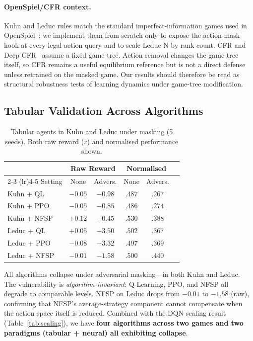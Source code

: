 \documentclass{article}
\begin{document}
\paragraph{OpenSpiel/CFR context.}
Kuhn and Leduc rules match the standard imperfect-information games used in OpenSpiel~\citep{lanctot2019openspiel}; we implement them from scratch only to expose the action-mask hook at every legal-action query and to scale Leduc-N by rank count. CFR and Deep CFR~\citep{zinkevich2007regret,brown2019deep} assume a fixed game tree. Action removal changes the game tree itself, so CFR remains a useful equilibrium reference but is not a direct defense unless retrained on the masked game. Our results should therefore be read as structural robustness tests of learning dynamics under game-tree modification.

\subsection{Tabular Validation Across Algorithms}
\label{sec:tabular}

\begin{table}[ht]
\centering
\caption{Tabular agents in Kuhn and Leduc under masking (5 seeds). Both raw reward ($r$) and normalised performance shown.}
\label{tab:tabular}
\begin{tabular}{lccccc}
\toprule
& \multicolumn{2}{c}{Raw Reward} & \multicolumn{2}{c}{Normalised} \\
\cmidrule(lr){2-3} \cmidrule(lr){4-5}
Setting & None & Advers. & None & Advers. \\
\midrule
Kuhn + QL & $-0.05$ & $-0.98$ & $.487$ & $.267$ \\
Kuhn + PPO & $-0.05$ & $-0.85$ & $.486$ & $.274$ \\
Kuhn + NFSP & $+0.12$ & $-0.45$ & $.530$ & $.388$ \\
Leduc + QL & $+0.05$ & $-3.50$ & $.502$ & $.367$ \\
Leduc + PPO & $-0.08$ & $-3.32$ & $.497$ & $.369$ \\
Leduc + NFSP & $-0.01$ & $-1.58$ & $.500$ & $.440$ \\
\bottomrule
\end{tabular}
\end{table}

All algorithms collapse under adversarial masking---in both Kuhn and Leduc. The vulnerability is \emph{algorithm-invariant}: Q-Learning, PPO, and NFSP all degrade to comparable levels. NFSP on Leduc drops from $-0.01$ to $-1.58$ (raw), confirming that NFSP's average-strategy component cannot compensate when the action space itself is reduced. Combined with the DQN scaling result (Table~\ref{tab:scaling}), we have \textbf{four algorithms across two games and two paradigms (tabular + neural) all exhibiting collapse}.
\end{document}
